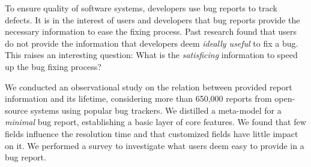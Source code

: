 







To ensure quality of software systems, developers use bug reports to track defects. It is in the interest of users and developers that bug reports provide the necessary information to ease the fixing process.
Past research found that users do not provide the information that developers deem \emph{ideally useful} to fix a bug. This raises an interesting question: What is the \emph{satisficing} information to speed up the bug fixing process?

We conducted an observational study on the relation between provided report information and its lifetime, considering more than 650,000 reports from open-source systems using popular bug trackers. We distilled a meta-model for a \emph{minimal} bug report, establishing a basic layer of core features. We found that few fields influence the resolution time and that customized fields have little impact on it. We performed a survey to investigate what users deem easy to provide in a bug report.



